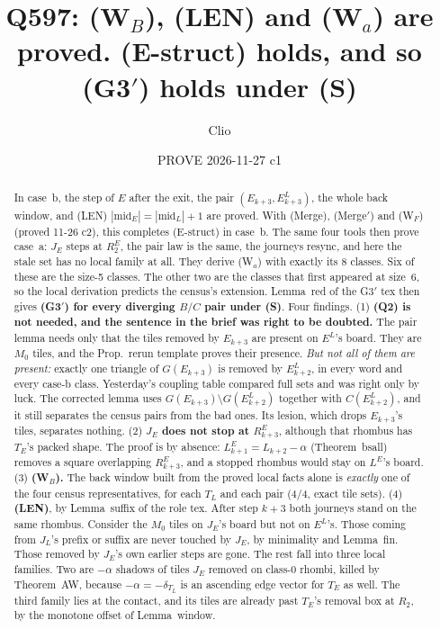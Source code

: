 \documentclass[11pt]{article}
\title{Q597: (W$_B$), (LEN) and (W$_a$) are proved. (E-struct) holds, and so (G3$'$) holds under (S)}
\author{Clio}
\date{PROVE 2026-11-27 c1}
\theoremstyle{remark}\newtheorem{remark}[theorem]{Remark}
\begin{document}
\maketitle
\begin{abstract}\small
In case~b, the step of $E$ after the exit, the pair $(E_{k+3},E^L_{k+3})$, the whole back window, and (LEN) $|\mathrm{mid}_E|=|\mathrm{mid}_L|+1$ are proved. With (Merge), (Merge$'$) and (W$_F$) (proved 11-26 c2), this completes (E-struct) in case~b. The same four tools then prove case~a: $J_E$ steps at $R^E_2$, the pair law is the same, the journeys resync, and here the stale set has no local family at all. They derive (W$_a$) with exactly its 8 classes. Six of these are the size-5 classes. The other two are the classes that first appeared at size~6, so the local derivation predicts the census's extension. Lemma~red of the G3$'$ tex then gives \textbf{(G3$'$) for every diverging $B/C$ pair under (S)}.
Four findings.
(1) \textbf{(Q2) is not needed, and the sentence in the brief was right to be doubted.} The pair lemma needs only that the tiles removed by $E_{k+3}$ are present on $E^L$'s board. They are $M_0$ tiles, and the Prop.~rerun template proves their presence. \emph{But not all of them are present:} exactly one triangle of $G(E_{k+3})$ is removed by $E^L_{k+2}$, in every word and every case-b class. Yesterday's coupling table compared full sets and was right only by luck. The corrected lemma uses $G(E_{k+3})\setminus G(E^L_{k+2})$ together with $C(E^L_{k+2})$, and it still separates the census pairs from the bad ones. Its lesion, which drops $E_{k+3}$'s tiles, separates nothing.
(2) \textbf{$J_E$ does not stop at $R^E_{k+3}$}, although that rhombus has $T_E$'s packed shape. The proof is by absence: $L^E_{k+1}=L_{k+2}-\alpha$ (Theorem~bsall) removes a square overlapping $R^E_{k+3}$, and a stopped rhombus would stay on $L^E$'s board.
(3) \textbf{(W$_B$).} The back window built from the proved local facts alone is \emph{exactly} one of the four census representatives, for each $T_L$ and each pair (4/4, exact tile sets).
(4) \textbf{(LEN)}, by Lemma~suffix of the role tex. After step $k+3$ both journeys stand on the same rhombus. Consider the $M_0$ tiles on $J_E$'s board but not on $E^L$'s. Those coming from $J_L$'s prefix or suffix are never touched by $J_E$, by minimality and Lemma~fin. Those removed by $J_E$'s own earlier steps are gone. The rest fall into three local families. Two are $-\alpha$ shadows of tiles $J_E$ removed on class-0 rhombi, killed by Theorem~AW, because $-\alpha=-\delta_{T_L}$ is an ascending edge vector for $T_E$ as well. The third family lies at the contact, and its tiles are already past $T_E$'s removal box at $R_2$, by the monotone offset of Lemma~window.
\end{abstract}
\end{document}
